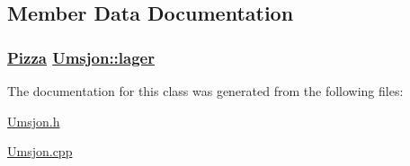 \subsection{Member Data Documentation}
\hypertarget{class_umsjon_0f90fe5c344e62852b747ecbdc5b5d90}{
\subsubsection[lager]{\setlength{\rightskip}{0pt plus 5cm}\hyperlink{class_pizza}{Pizza} \hyperlink{class_umsjon_0f90fe5c344e62852b747ecbdc5b5d90}{Umsjon::lager}}}
\label{class_umsjon_0f90fe5c344e62852b747ecbdc5b5d90}




The documentation for this class was generated from the following files:\begin{CompactItemize}
\item 
\hyperlink{_umsjon_8h}{Umsjon.h}\item 
\hyperlink{_umsjon_8cpp}{Umsjon.cpp}\end{CompactItemize}
